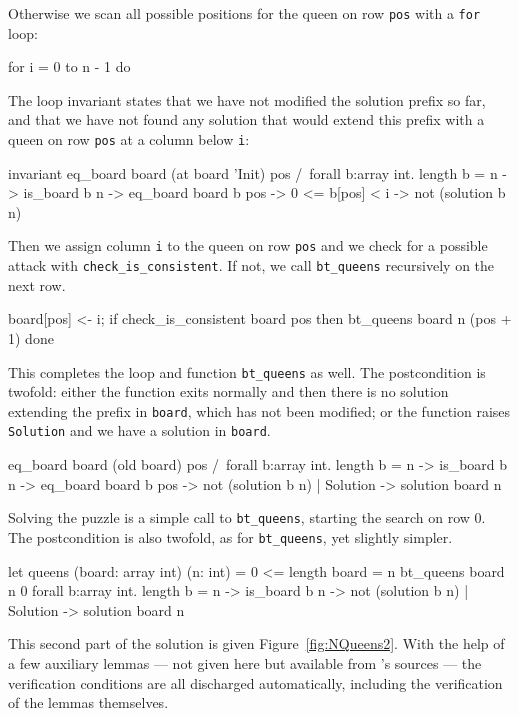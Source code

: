 Otherwise we scan all possible positions for the queen on row
\texttt{pos} with a \texttt{for} loop:
\begin{whycode}
    for i = 0 to n - 1 do
\end{whycode}
The loop invariant states that we have not modified the solution
prefix so far, and that we have not found any solution that would
extend this prefix with a queen on row \texttt{pos} at a column below
\texttt{i}:
\begin{whycode}
      invariant {
        eq_board board (at board 'Init) pos /\
        forall b:array int. length b = n -> is_board b n ->
          eq_board board b pos -> 0 <= b[pos] < i ->
            not (solution b n) }
\end{whycode}
Then we assign column \texttt{i} to the queen on row \texttt{pos} and
we check for a possible attack with \verb|check_is_consistent|. If
not, we call \verb|bt_queens| recursively on the next row.
\begin{whycode}
      board[pos] <- i;
      if check_is_consistent board pos then bt_queens board n (pos + 1)
    done
\end{whycode}
This completes the loop and function \verb|bt_queens| as well.
The postcondition is twofold: either the function exits normally and
then there is no solution extending the prefix in \texttt{board},
which has not been modified;
or the function raises \texttt{Solution} and we have a solution in
\texttt{board}.
\begin{whycode}
    { eq_board board (old board) pos /\
      forall b:array int. length b = n -> is_board b n ->
        eq_board board b pos -> not (solution b n) }
    | Solution ->
    { solution board n }
\end{whycode}
Solving the puzzle is a simple call to \verb|bt_queens|, starting the
search on row 0. The postcondition is also twofold, as for
\verb|bt_queens|, yet slightly simpler.
\begin{whycode}
  let queens (board: array int) (n: int) =
    { 0 <= length board = n }
    bt_queens board n 0
    { forall b:array int. length b = n -> is_board b n ->
                            not (solution b n) }
    | Solution -> { solution board n }
\end{whycode}
This second part of the solution is given Figure~\ref{fig:NQueens2}.
With the help of a few auxiliary lemmas --- not given here but available
from \why's sources --- the verification conditions are all discharged
automatically, including the verification of the lemmas themselves.
